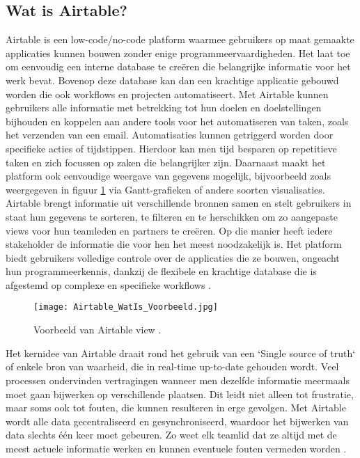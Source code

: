 \subsection{Wat is Airtable?}
\label{subsec:wat_is_airtable}

Airtable is een low-code/no-code platform waarmee gebruikers op maat gemaakte applicaties kunnen bouwen zonder enige programmeervaardigheden. Het laat toe om eenvoudig een interne database te creëren die belangrijke informatie voor het werk bevat. Bovenop deze database kan dan een krachtige applicatie gebouwd worden die ook workflows en projecten automatiseert. Met Airtable kunnen gebruikers alle informatie met betrekking tot hun doelen en doelstellingen bijhouden en koppelen aan andere tools voor het automatiseren van taken, zoals het verzenden van een email. Automatisaties kunnen getriggerd worden door specifieke acties of tijdstippen. Hierdoor kan men tijd besparen op repetitieve taken en zich focussen op zaken die belangrijker zijn. Daarnaast maakt het platform ook eenvoudige weergave van gegevens mogelijk, bijvoorbeeld zoals weergegeven in figuur \ref{fig:exampleairtable} via Gantt-grafieken of andere soorten visualisaties. Airtable brengt informatie uit verschillende bronnen samen en stelt gebruikers in staat hun gegevens te sorteren, te filteren en te herschikken om zo aangepaste views voor hun teamleden en partners te creëren. Op die manier heeft iedere stakeholder de informatie die voor hen het meest noodzakelijk is. Het platform biedt gebruikers volledige controle over de applicaties die ze bouwen, ongeacht hun programmeerkennis, dankzij de flexibele en krachtige database die is afgestemd op complexe en specifieke workflows \autocite{AirtableWhat}. \\

\begin{figure}[hb]
    \centering
    \texttt{[image: Airtable\_WatIs\_Voorbeeld.jpg]}
    \caption[Voorbeeld Airtable View]{Voorbeeld van Airtable view \autocite{AirtableWhat}.}
    \label{fig:exampleairtable}
\end{figure}

Het kernidee van Airtable draait rond het gebruik van een `Single source of truth` of enkele bron van waarheid, die in real-time up-to-date gehouden wordt. Veel processen ondervinden vertragingen 
wanneer men dezelfde informatie meermaals moet gaan bijwerken op verschillende plaatsen. Dit leidt niet alleen tot frustratie, maar soms ook tot fouten, die kunnen resulteren in erge gevolgen. Met Airtable wordt alle data gecentraliseerd en gesynchroniseerd, waardoor het bijwerken van data slechts één keer moet gebeuren. Zo weet elk teamlid dat ze altijd met de meest actuele informatie werken en kunnen eventuele fouten vermeden worden \autocite{AirtableWhat}. \\

